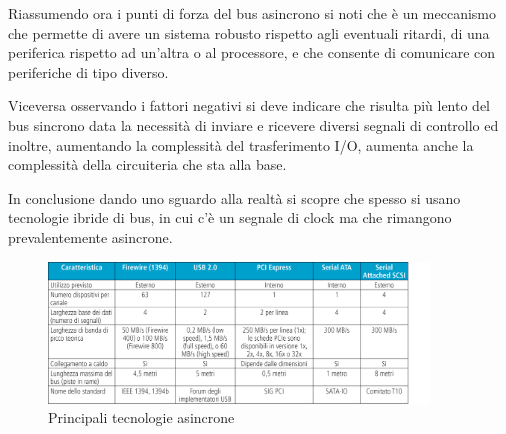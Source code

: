 \documentclass[class=book, crop=false, oneside]{standalone}
\begin{document}
Riassumendo ora i punti di forza del bus asincrono si noti che è un meccanismo che permette di avere un sistema robusto rispetto agli eventuali ritardi, di una periferica rispetto ad un'altra o al processore, e che consente di comunicare con periferiche di tipo diverso.

Viceversa osservando i fattori negativi si deve indicare che risulta più lento del bus sincrono data la necessità di inviare e ricevere diversi segnali di controllo ed inoltre, aumentando la complessità del trasferimento I/O, aumenta anche la complessità della circuiteria che sta alla base.

In conclusione dando uno sguardo alla realtà si scopre che spesso si usano tecnologie ibride di bus, in cui c’è un segnale di clock ma che rimangono prevalentemente asincrone.

\begin{figure}[H]
	\centering
	\includegraphics[width=0.9\textwidth,keepaspectratio]{tecnologie-asincrone}
	\caption{Principali tecnologie asincrone}
\end{figure}
\end{document}
